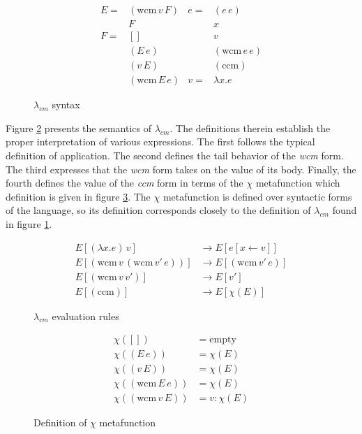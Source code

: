 \documentclass[ms,electronic,twosidetoc,letterpaper,chaptercenter,parttop]{byumsphd}
\begin{document}
\begin{figure}
\begin{align*}
E = &(\mathrm{wcm}\,v\,F) & e = &(e\,e)\\
    &F                    &     &x\\
F = &[]                   &     &v\\
    &(E\,e)               &     &(\mathrm{wcm}\,e\,e)\\
    &(v\,E)               &     &(\mathrm{ccm})\\
    &(\mathrm{wcm}\,E\,e) & v = & \lambda x. e
\end{align*}
\caption{$\lambda_{cm}$ syntax}
\label{language-syntax}
\end{figure}

Figure \ref{language-semantics} presents the semantics of $\lambda_{cm}$. The definitions
therein establish the proper interpretation of various expressions. The first follows the
typical definition of application. The second defines the tail behavior of the \emph{wcm}
form. The third expresses that the \emph{wcm} form takes on the value of its body.
Finally, the fourth defines the value of the \emph{ccm} form in terms of the $\chi$
metafunction which definition is given in figure \ref{chi-metafunction}. The $\chi$
metafunction is defined over syntactic forms of the language, so its definition
corresponds closely to the definition of $\lambda_{cm}$ found in figure
\ref{language-syntax}.

\begin{figure}
\begin{align*}
E[(\lambda x.e)\,v]                         &\rightarrow E[e[x\leftarrow v]]\\
E[(\mathrm{wcm}\,v\,(\mathrm{wcm}\,v'\,e))] &\rightarrow E[(\mathrm{wcm}\,v'\,e)]\\
E[(\mathrm{wcm}\,v\,v')]                    &\rightarrow E[v']\\
E[(\mathrm{ccm})]                           &\rightarrow E[\chi(E)]
\end{align*}
\caption{$\lambda_{cm}$ evaluation rules}
\label{language-semantics}
\end{figure}

\begin{figure}
\begin{align*}
\chi([])                   &= \mathrm{empty}\\
\chi((E\,e))               &= \chi(E)\\
\chi((v\,E))               &= \chi(E)\\
\chi((\mathrm{wcm}\,E\,e)) &= \chi(E)\\
\chi((\mathrm{wcm}\,v\,E)) &= v : \chi(E)
\end{align*}
\caption{Definition of $\chi$ metafunction}
\label{chi-metafunction}
\end{figure}
\end{document}
